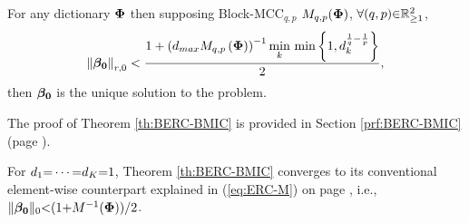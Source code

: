\begin{tcolorbox}
\begin{theorem}
\label{th:BERC-BMIC}
For any dictionary $\boldsymbol{\Phi}$  then supposing Block-MCC$_{q,p}$ $M_{q,p}(\boldsymbol{\Phi})$,  $\forall (q,p) {\in} \mathbb{R}^2_{{\geq} 1}$, 
\begin{equation*}
\left\lVert\boldsymbol{\beta_0}\right\rVert_{r,0} < 
\frac{1 + \left( d_{max} M_{q,p}\left( \boldsymbol{\Phi} \right)  \right)^{-1} \displaystyle\min_{k} \, \min \left\lbrace 1 , d_k^{\frac1q - \frac1p} \right\rbrace}{2},
\end{equation*}
then $\boldsymbol{\beta_0}$ is the unique solution to the  problem.
\end{theorem}
\end{tcolorbox}
The proof of Theorem \ref{th:BERC-BMIC} is provided in Section \ref{prf:BERC-BMIC} (page \pageref{prf:BERC-BMIC}).

For $d_1 {=} \cdots {=} d_K {=} 1$, Theorem \ref{th:BERC-BMIC} converges to its conventional element-wise counterpart explained in (\ref{eq:ERC-M}) on page \pageref{eq:ERC-M}, i.e., $\Vert \boldsymbol{\beta_0} \Vert_0 {<} (1 {+} M^{-1} (\boldsymbol{\Phi}))/2$.